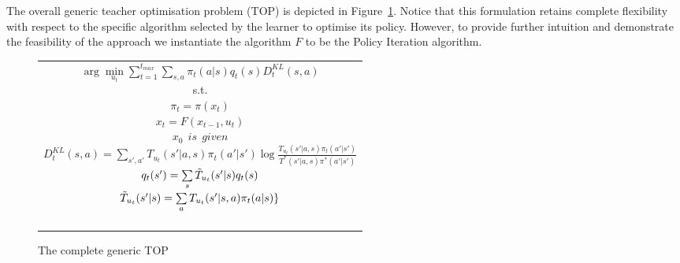 \documentclass[letterpaper]{aamas2009}
\begin{document}
The overall generic teacher optimisation problem (TOP) is depicted in
Figure~\ref{t_opt}. Notice that this formulation retains complete
flexibility with respect to the specific algorithm selected by the
learner to optimise its policy. However, to provide further intuition
and demonstrate the feasibility of the approach we instantiate the
algorithm $F$ to be the Policy Iteration algorithm.
\begin{figure}[ht]
\begin{tabular}{|c|} \hline \parbox{3.2 in} {\center 
$\arg\min\limits_{u_t}\sum\limits_{t=1}^{t_{max}}\sum\limits_{s,a}\pi_t(a|s)q_t(s)D^{KL}_t(s,a)$\\
s.t.\\
$\pi_t=\pi(x_t)$\\
$x_t=F(x_{t-1},u_t)$\\
$x_0\ \ \displaystyle{is\ \ given}$\\
$D^{KL}_t(s,a)=\sum\limits_{s',a'}T_{u_t}(s'|a,s)\pi_t(a'|s')\log\frac{T_{u_t}(s'|a,s)\pi_t(a'|s')}{T^*(s'|a,s)\pi^*(a'|s')}$\\
$q_t(s')=\sum\limits_s\Tilde{T}_{u_t}(s'|s)q_t(s)$\\
$\Tilde{T}_{u_t}(s'|s)=\sum\limits_aT_{u_t}(s'|s,a)\pi_t(a|s)\}$\\\ \\
}\\ \hline \end{tabular}
\caption{\label{t_opt}The complete generic TOP}
\end{figure}
\end{document}
